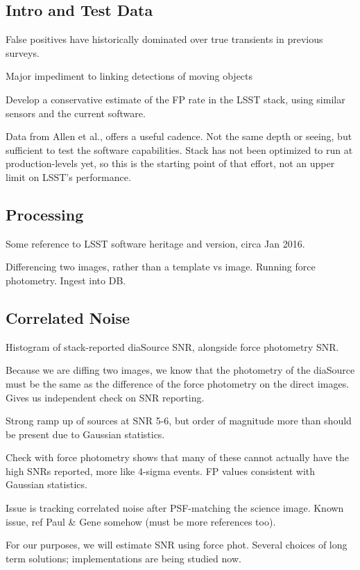 
\subsection{Intro and Test Data}

False positives have historically dominated over true transients in previous
surveys. \citep{goldstein15, kessler15}

Major impediment to linking detections of moving objects

Develop a conservative estimate of the FP rate in the LSST stack, using similar
sensors and the current software.

Data from Allen et al., offers a useful cadence. Not the same depth or seeing,
but sufficient to test the software capabilities. Stack has not been optimized
to run at production-levels yet, so this is the starting point of that effort,
not an upper limit on LSST's performance.

\subsection{Processing}

Some reference to LSST software heritage and version, circa Jan 2016.

Differencing two images, rather than a template vs image. Running force
photometry. Ingest into DB.

\subsection{Correlated Noise}

Histogram of stack-reported diaSource SNR, alongside force photometry SNR.

Because we are diffing two images, we know that the photometry of the diaSource
must be the same as the difference of the force photometry on the direct images.
Gives us independent check on SNR reporting.

Strong ramp up of sources at SNR 5-6, but order of magnitude more than should be
present due to Gaussian statistics.

Check with force photometry shows that many of these cannot actually have the
high SNRs reported, more like 4-sigma events. FP values consistent with Gaussian
statistics.

Issue is tracking correlated noise after PSF-matching the science image. Known
issue, ref Paul \& Gene somehow (must be more references too).

For our purposes, we will estimate SNR using force phot. Several choices of long
term solutions; implementations are being studied now.


